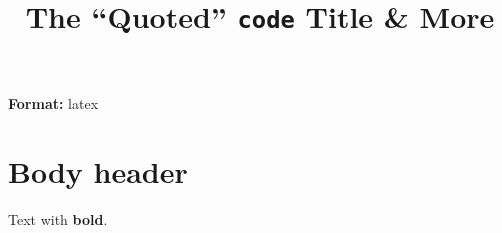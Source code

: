 \documentclass[
]{article}
\title{The ``Quoted'' \texttt{code} Title \& More}
\author{}
\date{}
\begin{document}
\maketitle

\textbf{Format:} latex

\section{Body header}\label{body-header}

Text with \textbf{bold}.
\end{document}
